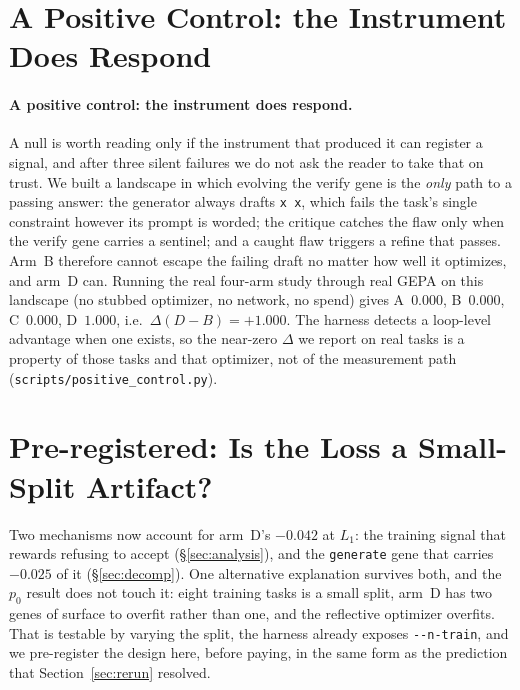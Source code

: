 \documentclass[11pt]{article}
\newcommand{\dd}{\ensuremath{\Delta}}
\begin{document}
\section{A Positive Control: the Instrument Does Respond}
\label{sec:posctrl}

\paragraph{A positive control: the instrument does respond.}
A null is worth reading only if the instrument that produced it can register a signal, and
after three silent failures we do not ask the reader to take that on trust. We built a
landscape in which evolving the verify gene is the \emph{only} path to a passing answer: the
generator always drafts \texttt{x\,x}, which fails the task's single constraint however its
prompt is worded; the critique catches the flaw only when the verify gene carries a sentinel;
and a caught flaw triggers a refine that passes. Arm~B therefore cannot escape the failing
draft no matter how well it optimizes, and arm~D can. Running the real four-arm study through
real GEPA on this landscape (no stubbed optimizer, no network, no spend) gives
A~$0.000$, B~$0.000$, C~$0.000$, D~$\mathbf{1.000}$, i.e.\ $\dd(D-B) = +1.000$. The harness
detects a loop-level advantage when one exists, so the near-zero $\dd$ we report on real tasks
is a property of those tasks and that optimizer, not of the measurement path
(\texttt{scripts/positive\_control.py}).


\section{Pre-registered: Is the Loss a Small-Split Artifact?}
\label{sec:prereg}
\label{sec:splitsweep}

Two mechanisms now account for arm~D's $-0.042$ at $L_1$: the training signal that rewards
refusing to accept (\S\ref{sec:analysis}), and the \texttt{generate} gene that carries $-0.025$
of it (\S\ref{sec:decomp}). One alternative explanation survives both, and the $p_0$ result
does not touch it: eight training tasks is a small split, arm~D has two genes of surface to
overfit rather than one, and the reflective optimizer overfits. That is testable by varying the
split, the harness already exposes \texttt{-{}-n-train}, and we pre-register the design here,
before paying, in the same form as the prediction that Section~\ref{sec:rerun} resolved.
\end{document}
